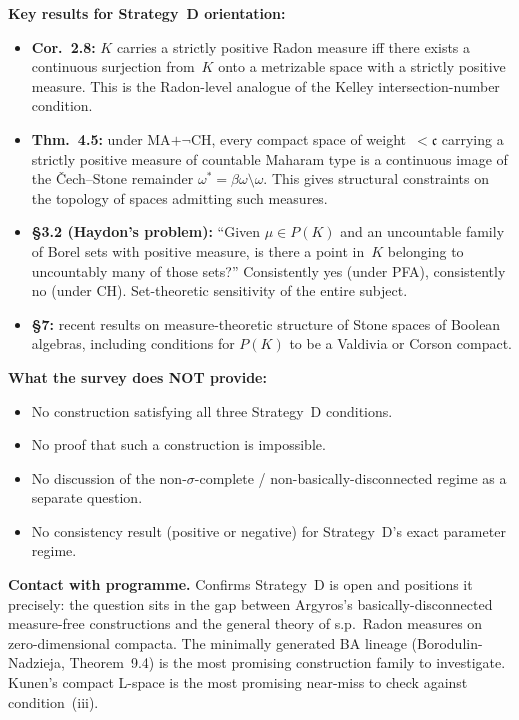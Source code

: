 \medskip\noindent
\textbf{Key results for Strategy~D orientation:}
\begin{itemize}[nosep]
  \item \textbf{Cor.~2.8:} $K$ carries a strictly positive Radon
    measure iff there exists a continuous surjection from~$K$ onto a
    metrizable space with a strictly positive measure.  This is the
    Radon-level analogue of the Kelley intersection-number condition.
  \item \textbf{Thm.~4.5:} under MA$+\neg$CH, every compact space of
    weight~$< \mathfrak{c}$ carrying a strictly positive measure of
    countable Maharam type is a continuous image of the \v{C}ech--Stone
    remainder $\omega^* = \beta\omega \setminus \omega$.  This gives
    structural constraints on the topology of spaces admitting such
    measures.
  \item \textbf{\S 3.2 (Haydon's problem):} ``Given $\mu \in P(K)$
    and an uncountable family of Borel sets with positive measure, is
    there a point in~$K$ belonging to uncountably many of those
    sets?''  Consistently yes (under PFA), consistently no (under CH).
    Set-theoretic sensitivity of the entire subject.
  \item \textbf{\S 7:} recent results on measure-theoretic structure
    of Stone spaces of Boolean algebras, including conditions for
    $P(K)$ to be a Valdivia or Corson compact.
\end{itemize}

\medskip\noindent
\textbf{What the survey does NOT provide:}
\begin{itemize}[nosep]
  \item No construction satisfying all three Strategy~D conditions.
  \item No proof that such a construction is impossible.
  \item No discussion of the non-$\sigma$-complete / non-basically-disconnected
    regime as a separate question.
  \item No consistency result (positive or negative) for Strategy~D's
    exact parameter regime.
\end{itemize}

\medskip\noindent
\textbf{Contact with programme.}  Confirms Strategy~D is open and
positions it precisely: the question sits in the gap between Argyros's
basically-disconnected measure-free constructions and the general
theory of s.p.\ Radon measures on zero-dimensional compacta.  The
minimally generated BA lineage (Borodulin-Nadzieja, Theorem~9.4) is
the most promising construction family to investigate.  Kunen's
compact L-space is the most promising near-miss to check against
condition~(iii).

